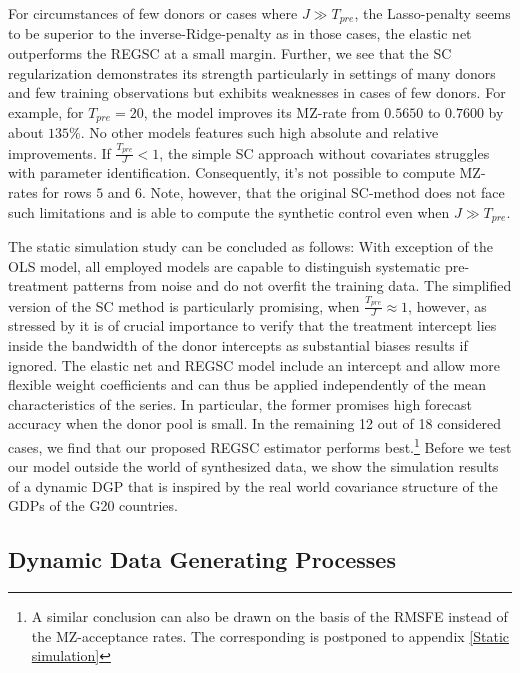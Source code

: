 For circumstances of few donors or cases where $J \gg T_{pre}$, the Lasso-penalty seems to be superior to the inverse-Ridge-penalty as in those cases, the elastic net outperforms the \ac{REGSC} at a small margin. Further, we see that the \ac{SC} regularization demonstrates its strength particularly in settings of many donors and few training observations but exhibits weaknesses in cases of few donors. For example, for $T_{pre} = 20$, the model improves its \ac{MZ}-rate from $0.5650$ to $0.7600$ by about $135\%$. No other models features such high absolute and relative improvements. If $\frac{T_{pre}}{J} < 1$, the simple \ac{SC} approach without covariates struggles with parameter identification. Consequently, it's not possible to compute \ac{MZ}-rates for rows $5$ and $6$. Note, however, that the original \ac{SC}-method does not face such limitations and is able to compute the synthetic control even when $J \gg T_{pre}$. 

The static simulation study can be concluded as follows: With exception of the OLS model, all employed models are capable to distinguish systematic pre-treatment patterns from noise and do not overfit the training data. The simplified version of the \ac{SC} method is particularly promising, when $\frac{T_{pre}}{J} \approx 1$, however, as stressed by \cite{abadie:2010} it is of crucial importance to verify that the treatment intercept lies inside the bandwidth of the donor intercepts as substantial biases results if ignored. The elastic net and \ac{REGSC} model include an intercept and allow more flexible weight coefficients and can thus be applied independently of the mean characteristics of the series. In particular, the former promises high forecast accuracy when the donor pool is small. In the remaining 12 out of 18 considered cases, we find that our proposed \ac{REGSC} estimator performs best.\footnote{A similar conclusion can also be drawn on the basis of the \ac{RMSFE} instead of the \ac{MZ}-acceptance rates. The corresponding is postponed to appendix \ref{Static simulation}}
Before we test our model outside the world of synthesized data, we show the simulation results of a dynamic \ac{DGP} that is inspired by the real world covariance structure of the \ac{GDP}s of the G20 countries.


\subsection{Dynamic Data Generating Processes}